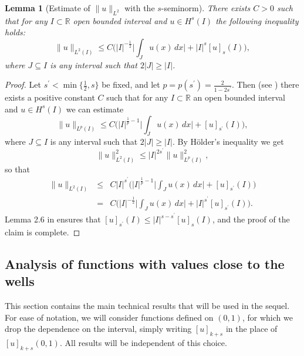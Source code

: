 \documentclass{article}
\newtheorem{lemma}{Lemma}%
\begin{document}
\begin{lemma}[Estimate of $\|u\|_{L^2}$ with the $s$-seminorm]
\label{stimaseminorma}
There exists $C>0$ such that 
for any $I\subset \mathbb R$ open bounded interval and $u\in H^s(I)$ the following inequality holds: 
\begin{equation}\label{stimaseminormaeq} 
\|u\|_{L^2(I)}\leq C\Big(|I|^{-\frac{1}{2}}\bigg|\int_J u(x)\, dx\bigg| +|I|^s [u]_{s}(I)\Big),  
\end{equation} 
where $J\subseteq I$ is any interval such that $2|J|\geq |I|$.  
\end{lemma}

\begin{proof} 
Let $s^\prime<\min\{\frac{1}{2},s\}$ be fixed, and let $p=p(s^\prime)=\frac{2}{1-2s^\prime}$. 
Then (see \cite[Corollary 2.3]{leofrac}) there exists a positive constant $C$ such that for any $I\subset \mathbb R$ an open bounded interval and $u\in H^s(I)$ we can estimate 
\begin{equation}\label{stimaseminormacor} 
\|u\|_{L^{p}(I)}\leq C\Big(|I|^{\frac{1}{p}-1}\Big|\int_J u(x)\, dx\Big| + [u]_{s^\prime}(I)\Big),  
\end{equation} 
where $J\subseteq I$ is any interval such that $2|J|\geq |I|$.  
By H\"older's inequality we get 
$$\|u\|^2_{L^2(I)}\leq |I|^{2s^\prime}\|u\|^2_{L^{p}(I)},$$ 
so that 
\begin{eqnarray*}%
\|u\|_{L^2(I)}&\leq&C|I|^{s^\prime}\bigg(|I|^{\frac{1}{p}-1}\Big|\int_J u(x)\, dx\Big| + [u]_{s^\prime}(I)\bigg)\\
&=& C\bigg(|I|^{-\frac{1}{2}}\Big|\int_J u(x)\, dx\Big| +|I|^{s^\prime} [u]_{s^\prime}(I)\bigg). 
\end{eqnarray*} 
Lemma 2.6 in \cite{leofrac} ensures that 
$[u]_{s^\prime}(I)\leq |I|^{s-s^\prime}[u]_{s}(I)$,
and the proof of the claim is complete. 
\end{proof}




\subsection{Analysis of functions with values close to the wells}
This section contains the main technical results that will be used in the sequel.
For ease of notation, we will consider functions defined on $(0,1)$, for which we drop the dependence on the interval, simply writing $[u]_{k+s}$ in the place of $[u]_{k+s}(0,1)$. All results will be independent of this choice.
\end{document}
